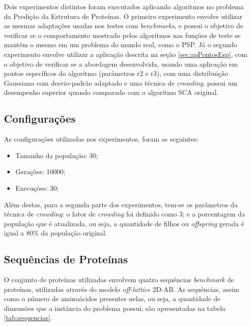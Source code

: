 Dois experimentos distintos foram executados aplicando algoritmos no problema da Predição da Estrutura de Proteínas. O primeiro experimento envolve utilizar as mesmas adaptações usadas nos testes com \textit{benchmarks}, e possui o objetivo de verificar se o comportamento mostrado pelos algoritmos nas funções de teste se mantém o mesmo em um problema do mundo real, como o PSP. Já o segundo experimento envolve utilizar a aplicação descrita na seção \ref{sec:apPontosEsp}, com o objetivo de verificar se a abordagem desenvolvida, usando uma aplicação em pontos específicos do algoritmo (parâmetros r2 e r3), com uma distribuição Gaussiana com desvio-padrão adaptado e uma técnica de \textit{crowding}, possui um desempenho superior quando comparado com o algoritmo SCA original.

\subsection{Configurações}
\label{sec:config}

As configurações utilizadas nos experimentos, foram as seguintes:

\begin{itemize}
    \item Tamanho da população: 30;
    \item Gerações: 10000;
    \item Execuções: 30;
\end{itemize}

Além destas, para a segunda parte dos experimentos, tem-se os parâmetros da técnica de \textit{crowding}: o fator de \textit{crowding} foi definido como 3; e a porcentagem da população que é atualizada, ou seja, a quantidade de filhos ou \textit{offspring} gerada é igual a 80\% da população original.

\subsection{Sequências de Proteínas}

O conjunto de proteínas utilizadas envolvem quatro sequências \textit{benchmark} de proteínas, utilizadas através do modelo \textit{off-lattice} 2D-AB. As sequências, assim como o número de aminoácidos presentes nelas, ou seja, a quantidade de dimensões que a instância do problema possui, são apresentadas na tabela \ref{tab:sequencias}.


